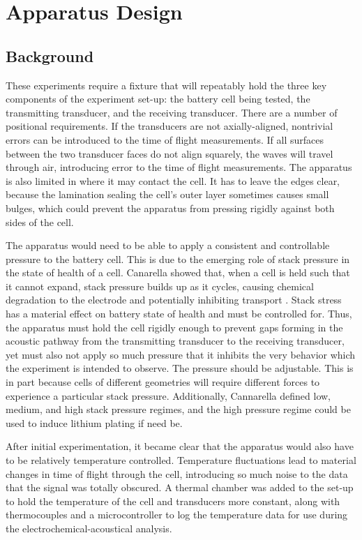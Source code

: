 \chapter{Apparatus Design}

\section{Background}
These experiments require a fixture that will repeatably hold the three key components of the experiment set-up: the battery cell being tested, the transmitting transducer, and the receiving transducer. 
There are a number of positional requirements. 
If the transducers are not axially-aligned, nontrivial errors can be introduced to the time of flight measurements.
If all surfaces between the two transducer faces do not align squarely, the waves will travel through air, introducing error to the time of flight measurements. 
The apparatus is also limited in where it may contact the cell. It has to leave the edges clear, because the lamination sealing the cell's outer layer sometimes causes small bulges, which could prevent the apparatus from pressing rigidly against both sides of the cell.

The apparatus would need to be able to apply a consistent and controllable pressure to the battery cell. 
This is due to the emerging role of stack pressure in the state of health of a cell. 
Canarella showed that, when a cell is held such that it cannot expand, stack pressure builds up as it cycles, causing chemical degradation to the electrode and potentially inhibiting transport \cite{STACK-STRESS}. Stack stress has a material effect on battery state of health and must be controlled for.
Thus, the apparatus must hold the cell rigidly enough to prevent gaps forming in the acoustic pathway from the transmitting transducer to the receiving transducer, yet must also not apply so much pressure that it inhibits the very behavior which the experiment is intended to observe. 
The pressure should be adjustable. This is in part because cells of different geometries will require different forces to experience a particular stack pressure. 
Additionally, Cannarella defined low, medium, and high stack pressure regimes, and the high pressure regime could be used to induce lithium plating if need be.

After initial experimentation, it became clear that the apparatus would also have to be relatively temperature controlled. 
Temperature fluctuations lead to material changes in time of flight through the cell, introducing so much noise to the data that the signal was totally obscured.
A thermal chamber was added to the set-up to hold the temperature of the cell and transducers more constant, along with thermocouples and a microcontroller to log the temperature data for use during the electrochemical-acoustical analysis.

